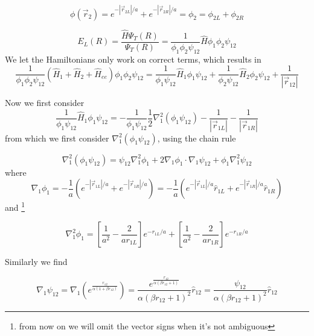 \documentclass{article}
\begin{document}
\begin{equation}
 \phi(\vec{r}_2) = e^{-|\vec{r}_{2L}|/a} + e^{-|\vec{r}_{2R}|/a} =\phi_2 = \phi_{2L} +\phi_{2R}
\end{equation}

\begin{equation}
 E_L(R)=\frac{\hat{H}\Psi_T(R)}{\Psi_T(R)}=\frac{1}{\phi_1\phi_2\psi_{12}} \hat{H} \phi_1\phi_2\psi_{12}
\end{equation}
We let the Hamiltonians only work on correct terms, which results in
\begin{equation}
 \frac{1}{\phi_1\phi_2\psi_{12}}(\hat{H}_1 + \hat{H}_2 + \hat{H}_{ee})\phi_1\phi_2\psi_{12}=\frac{1}{\phi_1\psi_{12}}\hat{H}_1 \phi_1\psi_{12} + \frac{1}{\phi_2\psi_{12}}\hat{H}_2 \phi_2\psi_{12} + \frac{1}{|\vec{r}_{12}|}
\end{equation}

Now we first consider
\begin{equation}
 \frac{1}{\phi_1\psi_{12}}\hat{H}_1 \phi_1\psi_{12} = - \frac{1}{\phi_1\psi_{12}} \frac12 \nabla_1^2(\phi_1\psi_{12}) - \frac{1}{|\vec{r}_{1L}|} -\frac{1}{|\vec{r}_{1R}|}
\end{equation}
from which we first consider $\nabla_1^2(\phi_1\psi_{12})$, using the chain rule 

\begin{equation}
\label{master}
\nabla_1^2(\phi_1\psi_{12}) = \psi_{12}\nabla_1^2\phi_1 + 2 \nabla_1\phi_1 \cdot \nabla_1  \psi_{12} + \phi_1\nabla_1^2\psi_{12}
\end{equation}
where
\begin{equation}
\label{no1}
 \nabla_1\phi_1 =-\frac1a \left( e^{-|\vec{r}_{1L}|/a} + e^{-|\vec{r}_{1R}|/a} \right)=-\frac1a \left(  e^{-|\vec{r}_{1L}|/a}\hat{r}_{1L} +e^{-|\vec{r}_{1R}|/a}\hat{r}_{1R} \right)
\end{equation}
and \footnote{from now on we will omit the vector signs when it's not ambiguous}

\begin{equation}
\label{no2}
 \nabla_1^2\phi_1 =  \left[\frac{1}{a^2}-\frac{2}{a{r}_{1L}} \right] e^{-{r}_{1L}/a} + \left[\frac{1}{a^2}-\frac{2}{a{r}_{1R}} \right] e^{-{r}_{1R}/a} 
\end{equation}

Similarly we find

\begin{equation}
\label{no3}
 \nabla_1 \psi_{12}= \nabla_1 \left( e^{\frac{{r}_{12} }{\alpha(1+\beta {r}_{12})} } \right) = \frac{e^{\frac{r_{12}}{\alpha (\beta r_{12}+1)}}}{\alpha (\beta r_{12}+1)^2}\hat{r}_{12}=\frac{\psi_{12}}{\alpha (\beta r_{12}+1)^2}\hat{r}_{12}
\end{equation}
\end{document}
